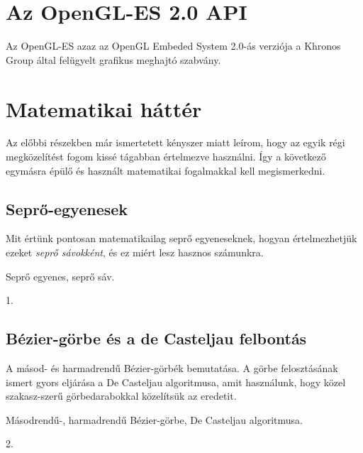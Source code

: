 \documentclass[12pt]{report}
\theoremstyle{definition}
\begin{document}
    \section[GLES2 API]{Az OpenGL-ES 2.0 API}
    \label{GLES2 API}

Az OpenGL-ES azaz az OpenGL Embeded System 2.0-ás verziója a Khronos Group
által felügyelt grafikus meghajtó szabvány.

    \section[Matematikai háttér]{Matematikai háttér}
    \label{Matematikai háttér}

Az előbbi részekben már ismertetett kényszer miatt leírom, hogy az egyik régi
megközelítést fogom kissé tágabban értelmezve használni. Így a következő
egymásra épülő és használt matematikai fogalmakkal kell megismerkedni.

    \subsection*{Seprő-egyenesek}
    \label{Seprő-egyenesek}

Mit értünk pontosan matematikailag seprő egyeneseknek, hogyan értelmezhetjük
ezeket \emph{seprő sávokként}, és ez miért lesz hasznos számunkra.

  \begin{description}[noitemsep]
    \item[Kulcsszavak] Seprő egyenes, seprő sáv.
    \item[Becsült oldalszám] 1.
  \end{description}

    \subsection*{Bézier-görbe és a de Casteljau felbontás}
    \label{Bézier-görbe és a de Casteljau felbontás}

A másod- és harmadrendű Bézier-görbék bemutatása. A görbe felosztásának ismert
gyors eljárása a De Casteljau algoritmusa, amit használunk, hogy közel
szakasz-szerű görbedarabokkal közelítsük az eredetit.

  \begin{description}[noitemsep]
    \item[Kulcsszavak] Másodrendű-, harmadrendű Bézier-görbe, De
    Casteljau algoritmusa.
    \item[Becsült oldalszám] 2.
  \end{description}
\end{document}
